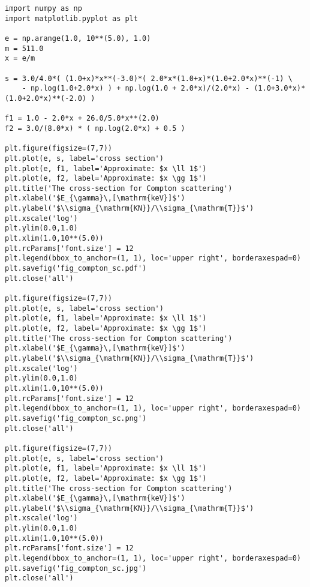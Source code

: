 \begin{lstlisting}[caption = hogehoge,label = code:1_1_1]
import numpy as np
import matplotlib.pyplot as plt

e = np.arange(1.0, 10**(5.0), 1.0)
m = 511.0
x = e/m

s = 3.0/4.0*( (1.0+x)*x**(-3.0)*( 2.0*x*(1.0+x)*(1.0+2.0*x)**(-1) \
    - np.log(1.0+2.0*x) ) + np.log(1.0 + 2.0*x)/(2.0*x) - (1.0+3.0*x)*(1.0+2.0*x)**(-2.0) )

f1 = 1.0 - 2.0*x + 26.0/5.0*x**(2.0)
f2 = 3.0/(8.0*x) * ( np.log(2.0*x) + 0.5 )

plt.figure(figsize=(7,7))
plt.plot(e, s, label='cross section')
plt.plot(e, f1, label='Approximate: $x \ll 1$')
plt.plot(e, f2, label='Approximate: $x \gg 1$')
plt.title('The cross-section for Compton scattering')
plt.xlabel('$E_{\gamma}\,[\mathrm{keV}]$')
plt.ylabel('$\\sigma_{\mathrm{KN}}/\\sigma_{\mathrm{T}}$')
plt.xscale('log')
plt.ylim(0.0,1.0)
plt.xlim(1.0,10**(5.0))
plt.rcParams['font.size'] = 12
plt.legend(bbox_to_anchor=(1, 1), loc='upper right', borderaxespad=0)
plt.savefig('fig_compton_sc.pdf')
plt.close('all')

plt.figure(figsize=(7,7))
plt.plot(e, s, label='cross section')
plt.plot(e, f1, label='Approximate: $x \ll 1$')
plt.plot(e, f2, label='Approximate: $x \gg 1$')
plt.title('The cross-section for Compton scattering')
plt.xlabel('$E_{\gamma}\,[\mathrm{keV}]$')
plt.ylabel('$\\sigma_{\mathrm{KN}}/\\sigma_{\mathrm{T}}$')
plt.xscale('log')
plt.ylim(0.0,1.0)
plt.xlim(1.0,10**(5.0))
plt.rcParams['font.size'] = 12
plt.legend(bbox_to_anchor=(1, 1), loc='upper right', borderaxespad=0)
plt.savefig('fig_compton_sc.png')
plt.close('all')

plt.figure(figsize=(7,7))
plt.plot(e, s, label='cross section')
plt.plot(e, f1, label='Approximate: $x \ll 1$')
plt.plot(e, f2, label='Approximate: $x \gg 1$')
plt.title('The cross-section for Compton scattering')
plt.xlabel('$E_{\gamma}\,[\mathrm{keV}]$')
plt.ylabel('$\\sigma_{\mathrm{KN}}/\\sigma_{\mathrm{T}}$')
plt.xscale('log')
plt.ylim(0.0,1.0)
plt.xlim(1.0,10**(5.0))
plt.rcParams['font.size'] = 12
plt.legend(bbox_to_anchor=(1, 1), loc='upper right', borderaxespad=0)
plt.savefig('fig_compton_sc.jpg')
plt.close('all')
\end{lstlisting}
